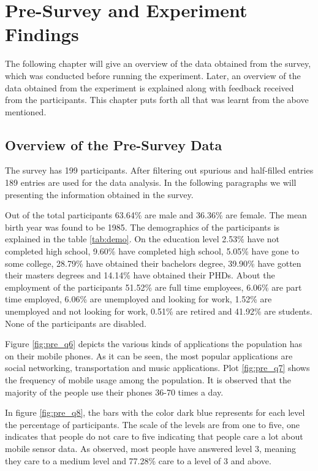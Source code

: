
\chapter{Pre-Survey and Experiment Findings}
The following chapter will give an overview of the data obtained from the survey, which was conducted before running the experiment.
Later, an overview of the data obtained from the experiment is explained along with feedback received from the participants. This chapter puts forth
all that was learnt from the above mentioned.

\section{Overview of the Pre-Survey Data}
The survey has 199 participants. After filtering out spurious and half-filled entries 189 entries are used for the data analysis. In the following paragraphs we will presenting the information obtained in the survey.

Out of the total
participants 63.64\% are male and 36.36\% are female. The mean birth year was found to be 1985. The demographics of the participants is explained in the table \ref{tab:demo}. On the education level 2.53\% have not completed high school, 9.60\% have completed high school, 5.05\% have gone to some college, 28.79\% have obtained their bachelors degree, 39.90\% have gotten their masters degrees and 14.14\% have obtained their PHDs. About the employment of the participants 51.52\% are full time employees, 6.06\% are part time employed, 6.06\% are unemployed and looking for work, 1.52\% are unemployed and not looking for work, 0.51\% are retired and 41.92\% are students. None of the participants are disabled. 

Figure \ref{fig:pre_q6} depicts the various kinds of applications the population has on their mobile phones. As it can be seen, the most popular applications are social networking, transportation and music applications. Plot \ref{fig:pre_q7} shows the frequency of mobile usage among the population. It is observed that the majority of the people use their phones 36-70 times a day.

In figure \ref{fig:pre_q8}, the bars with the color dark blue represents for each level the percentage of participants. The scale of the levels are from one to five, one indicates that people do not care to five indicating that people care a lot about mobile sensor data. As observed, most people have answered level 3, meaning they care to a medium level and 77.28\% care to a level of 3 and above.

